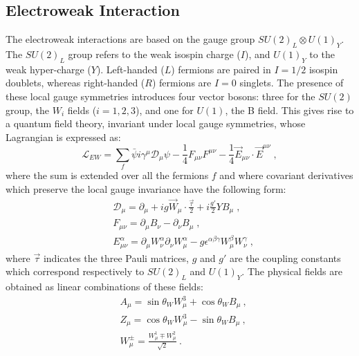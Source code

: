 \subsection*{Electroweak Interaction}
The electroweak interactions are based on the gauge group  $SU(2)_L \otimes U(1)_Y$. 
The $SU(2)_L$ group refers to the weak isospin charge ($I$), and $U(1)_Y$ to the weak hyper-charge ($Y$). 
Left-handed ($L$) fermions are paired in $I = 1/2$ isospin doublets, whereas
right-handed ($R$) fermions are $I = 0$ singlets. The presence of these local gauge symmetries
introduces four vector bosons: three for the $SU(2)$ group, the $W_i$ fields ($i = 1, 2, 3$), and
one for $U (1)$, the B field.
This gives rise to a quantum field theory, invariant under local gauge symmetries, whose
Lagrangian is expressed as:
\newline
\begin{equation}
 \mathcal{L}_{EW}= \sum_f \bar{\psi} i \gamma^{\mu }\mathcal{D}_{\mu} \psi -\frac{1}{4} F_{\mu \nu} F^{\mu \nu}  -\frac{1}{4} \vec{E}_{\mu \nu} \cdot \vec{E}^{\mu \nu} \; ,
\end{equation}
where the sum is extended over all the fermions $f$ and where covariant derivatives which
preserve the local  gauge invariance have the following form:
\begin{equation}
\begin{split}
&\mathcal{D}_{\mu} = \partial_{\mu} +ig \vec{W}_{\mu} \cdot \frac{\vec{\tau}}{2} + i\frac{g'}{2} Y B_{\mu}   \; , \\
& F_{\mu \nu}= \partial_{\mu} B_{\nu} -\partial_{\nu} B_{\mu}  \; ,\\
& E_{\mu \nu}^{\alpha}=  \partial_{\mu} W_{\nu}^{\alpha}  \partial_{\nu} W_{\mu}^{\alpha} -g\epsilon^{\alpha \beta \gamma}  W_{\mu}^{\beta} W_{\nu}^{\gamma} \; ,
\end{split}
\end{equation}
\newline
where $\vec{\tau}$ indicates the three Pauli matrices, $g$ and $g'$ are the coupling constants which correspond respectively
to  $SU(2)_L$ and $U(1)_Y$. 
The physical fields are obtained as linear combinations of these fields:
\newline
\begin{equation}
\begin{split}
&A_{\mu}= \sin \theta_W W_{\mu}^3 + \cos \theta_W B_{\mu} \: ,\\
&Z_{\mu}= \cos \theta_W W_{\mu}^3 - \sin \theta_W B_{\mu}  \: ,\\
&W_{\mu}^{\pm}=\frac{W_{\mu}^1 \mp W_{\mu}^2 }{ \sqrt{2}} \: .
\end{split}
\end{equation}
